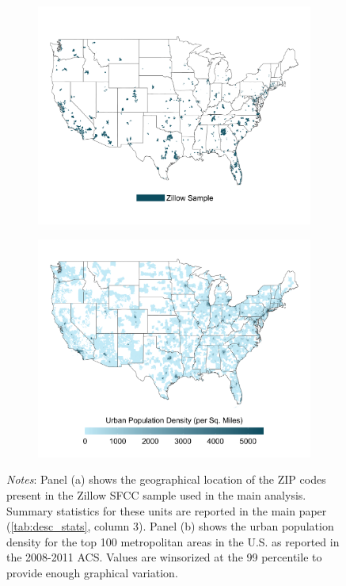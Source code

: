 \clearpage
\begin{figure}
	\caption{Comparison Between Zillow Sample and Population Density}
	\label{fig:maps}
	\begin{subfigure}[b]{\textwidth}\centering
		\includegraphics[width = .85\textwidth]{../../analysis/descriptive_maps/output/sample_map.png}
	\end{subfigure}
	\quad 
	\begin{subfigure}[b]{\textwidth}\centering
		\includegraphics[width = .85\textwidth]{../../analysis/descriptive_maps/output/popurban_density_map.png}
	\end{subfigure}
		\begin{minipage}{.95\textwidth} \footnotesize
		\vspace{2mm} 
		\textit{Notes}: Panel (a) shows the geographical location of the ZIP codes present in the Zillow 
		SFCC sample used in the main analysis. Summary statistics for these units are reported in the main
		paper (\autoref{tab:desc_stats}, column 3). Panel (b) shows the urban population density for the top 
		100 metropolitan areas in the U.S. as reported in the 2008-2011 ACS. Values are winsorized at the 99 
		percentile to provide enough graphical variation.
	\end{minipage}
\end{figure}

